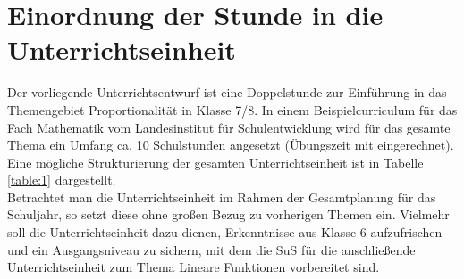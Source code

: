 \documentclass[../main.tex]{subfiles}
\begin{document}
\section{Einordnung der Stunde in die Unterrichtseinheit}
Der vorliegende Unterrichtsentwurf ist eine Doppelstunde zur Einführung in das Themengebiet \glqq Proportionalität\grqq{} in Klasse 7/8. In einem Beispielcurriculum für das Fach Mathematik vom \glqq Landesinstitut für Schulentwicklung\grqq{} \cite{Schulentwicklung2017} wird für das gesamte Thema ein Umfang ca. 10 Schulstunden angesetzt (Übungszeit mit eingerechnet). Eine mögliche Strukturierung der gesamten Unterrichtseinheit ist in Tabelle \ref{table:1} dargestellt.\\
Betrachtet man die Unterrichtseinheit im Rahmen der Gesamtplanung für das Schuljahr, so setzt diese ohne großen Bezug zu vorherigen Themen ein. Vielmehr soll die Unterrichtseinheit dazu dienen, Erkenntnisse aus Klasse 6 aufzufrischen und ein Ausgangsniveau zu sichern, mit dem die SuS für die anschließende Unterrichtseinheit zum Thema \glqq Lineare Funktionen \grqq{} vorbereitet sind.\\ 
\end{document}
